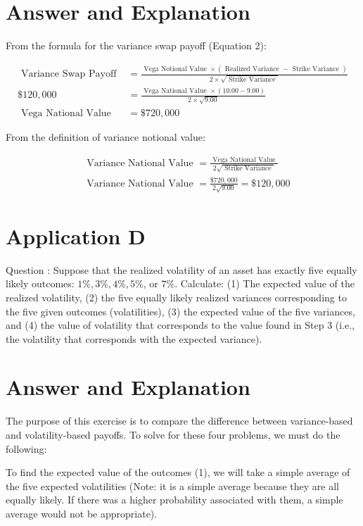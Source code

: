 \documentclass[11pt]{article}
\begin{document}
\section*{Answer and Explanation}
From the formula for the variance swap payoff (Equation 2):

$$
\begin{aligned}
\text { Variance Swap Payoff } & =\frac{\text { Vega Notional Value } \times(\text { Realized Variance }- \text { Strike Variance })}{2 \times \sqrt{\text { Strike Variance }}} \\
\$ 120,000 & =\frac{\text { Vega National Value } \times(10.00-9.00)}{2 \times \sqrt{9.00}} \\
\text { Vega National Value } & =\$ 720,000
\end{aligned}
$$

From the definition of variance notional value:

$$
\begin{aligned}
& \text { Variance National Value }=\frac{\text { Vega National Value }}{2 \sqrt{\text { Strike Variance }}} \\
& \text { Variance National Value }=\frac{\$ 720,000}{2 \sqrt{9.00}}=\$ 120,000
\end{aligned}
$$

\section*{Application D}
Question : Suppose that the realized volatility of an asset has exactly five equally likely outcomes: $1 \%, 3 \%, 4 \%, 5 \%$, or $7 \%$. Calculate: (1) The expected value of the realized volatility, (2) the five equally likely realized variances corresponding to the five given outcomes (volatilities), (3) the expected value of the five variances, and (4) the value of volatility that corresponds to the value found in Step 3 (i.e., the volatility that corresponds with the expected variance).

\section*{Answer and Explanation}
The purpose of this exercise is to compare the difference between variance-based and volatility-based payoffs. To solve for these four problems, we must do the following:

To find the expected value of the outcomes (1), we will take a simple average of the five expected volatilities (Note: it is a simple average because they are all equally likely. If there was a higher probability associated with them, a simple average would not be appropriate).
\end{document}
